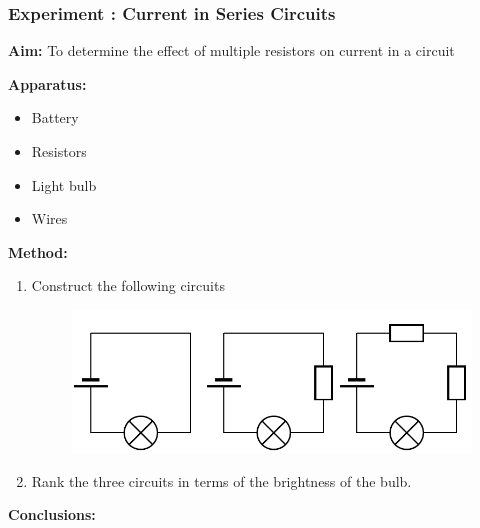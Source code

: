           
\label{m38776*eip-186}
            \subsubsection{ Experiment : Current in Series Circuits}
            \nopagebreak
            \label{m38776*id66871}\noindent{}\textbf{Aim:}
          To determine the effect of multiple resistors on current in a circuit\par 
        \label{m38776*id66886}\noindent{}\textbf{Apparatus:}
          
        \label{m38776*id66895}\begin{itemize}[noitemsep]
            \label{m38776*uid49}\item Battery
\label{m38776*uid50}\item Resistors
\label{m38776*uid51}\item Light bulb
\label{m38776*uid52}\item Wires
\end{itemize}
        \par 
        \label{m38776*id66948}\noindent{}\textbf{Method:}
          
        \label{m38776*id66957}\begin{enumerate}[noitemsep, label=\textbf{\arabic*}. ] 
            \label{m38776*uid53}\item Construct the following circuits

    \setcounter{subfigure}{0}


	\begin{figure}[H] %
    \begin{center}
    \label{m38776*id66976!!!underscore!!!media}\label{m38776*id66976!!!underscore!!!printimage}\includegraphics{col11305.imgs/m38776_PG10C9_027.png} %
        
      \vspace{2pt}
    \vspace{.1in}
    
    \end{center}

 \end{figure}   

    \addtocounter{footnote}{-0}
    \label{m38776*uid54}\item Rank the three circuits in terms of the brightness of the bulb.
\end{enumerate}
        \par 
        \label{m38776*id66996}\noindent{}\textbf{Conclusions:}
          
